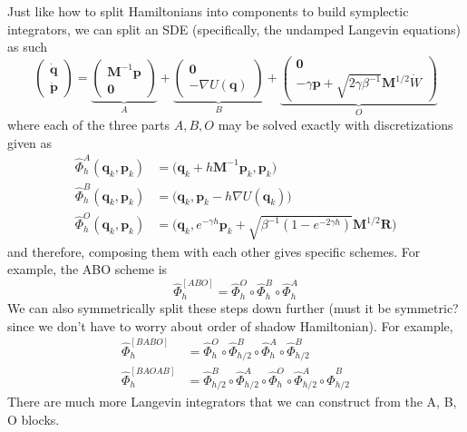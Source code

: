 \documentclass{article}
\begin{document}
    Just like how to split Hamiltonians into components to build symplectic integrators, we can split an SDE (specifically, the undamped Langevin equations) as such 
    \begin{equation}
      \begin{pmatrix} \mathbf{\dot{q}} \\ \mathbf{\dot{p}} \end{pmatrix} = \underbrace{\begin{pmatrix} \mathbf{M}^{-1} \mathbf{p} \\ \mathbf{0} \end{pmatrix}}_{A} + \underbrace{\begin{pmatrix} \mathbf{0} \\ -\nabla U(\mathbf{q}) \end{pmatrix}}_{B} + \underbrace{\begin{pmatrix} \mathbf{0} \\ -\gamma \mathbf{p} + \sqrt{2 \gamma \beta^{-1}} \mathbf{M}^{1/2} \dot{W} \end{pmatrix}}_{O}
    \end{equation}
    where each of the three parts $A, B, O$ may be solved exactly with discretizations given as 
    \begin{align*}
      \hat{\Phi}_h^A (\mathbf{q}_k, \mathbf{p}_k) & = \big(\mathbf{q}_k + h \mathbf{M}^{-1} \mathbf{p}_k, \mathbf{p}_k \big) \\
      \hat{\Phi}_h^B (\mathbf{q}_k, \mathbf{p}_k) & = \big(\mathbf{q}_k, \mathbf{p}_k - h \nabla U(\mathbf{q}_k) \big) \\
      \hat{\Phi}_h^O (\mathbf{q}_k, \mathbf{p}_k) & = \big(\mathbf{q}_k, e^{-\gamma h} \mathbf{p}_k + \sqrt{\beta^{-1} (1 - e^{-2 \gamma h})} \mathbf{M}^{1/2} \mathbf{R}\big)
    \end{align*}
    and therefore, composing them with each other gives specific schemes. For example, the ABO scheme is 
    \begin{equation}
      \hat{\Phi}_h^{[ABO]} = \hat{\Phi}_h^O \circ \hat{\Phi}_h^B \circ \hat{\Phi}_h^A
    \end{equation}
    We can also symmetrically split these steps down further (must it be symmetric? since we don't have to worry about order of shadow Hamiltonian). For example, 
    \begin{align*}
      \hat{\Phi}_h^{[BABO]} & = \hat{\Phi}_h^O \circ \hat{\Phi}_{h/2}^B \circ \hat{\Phi}_h^A \circ \hat{\Phi}_{h/2}^B \\
      \hat{\Phi}_h^{[BAOAB]} & = \hat{\Phi}_{h/2}^B \circ \hat{\Phi}_{h/2}^A \circ \hat{\Phi}_h^O \circ \hat{\Phi}_{h/2}^A \circ \hat{\Phi}_{h/2}^B
    \end{align*}
    There are much more Langevin integrators that we can construct from the A, B, O blocks. 
\end{document}
